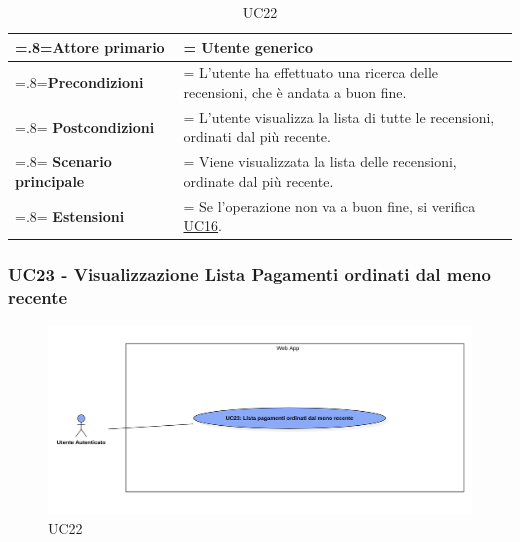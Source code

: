             \begin{table}[H]
                \centering
                \renewcommand{\arraystretch}{1.8}
                \renewcommand\tabularxcolumn[1]{m{#1}}
                \begin{tabularx}{0.9\textwidth} {
                    >{\hsize=.8\hsize\linewidth=\hsize}X
                    >{\hsize=1.2\hsize\linewidth=\hsize}X}
                    \hline
                    \textbf{Attore primario} & Utente generico \\
                    \hline
                    \textbf{Precondizioni} & L'utente ha effettuato una ricerca delle recensioni, che è andata a buon fine. \\
                    \hline
                    \textbf{Postcondizioni} & L'utente visualizza la lista di tutte le recensioni, ordinati dal più recente. \\
                    \hline
                    \textbf{Scenario principale} & Viene visualizzata la lista delle recensioni, ordinate dal più recente. \\
                    \hline
                    \textbf{Estensioni} & Se l'operazione non va a buon fine, si verifica \hyperref[UC16]{UC16}. \\
                    \hline
                \end{tabularx}
                \caption{UC22}
            \end{table}

            \subsubsection{UC23 - Visualizzazione Lista Pagamenti ordinati dal meno recente}
        \label{UC23}

        \begin{figure}[H]
            \centering
            \includegraphics[scale=0.4]{src/img/UC23.png}
            \caption{UC22}
        \end{figure}

